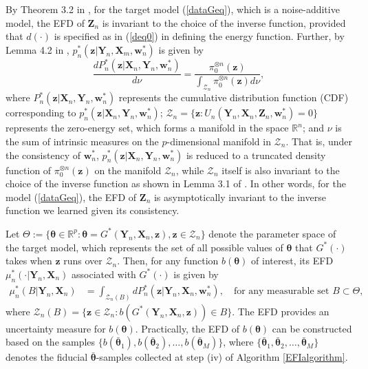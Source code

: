 \documentclass[11pt]{article}
\newcommand{\bX}{{\boldsymbol X}}
\newcommand{\bY}{{\boldsymbol Y}}
\newcommand{\bz}{{\boldsymbol z}}
\newcommand{\bZ}{{\boldsymbol Z}}
\newcommand{\bw}{{\boldsymbol w}}
\newcommand{\btheta}{{\boldsymbol \theta}}
\begin{document}
By Theorem 3.2 in \cite{LiangKS2024EFI}, for the target model (\ref{dataGeq}), which is a noise-additive model, the EFD of $\bZ_n$ is 
invariant to the choice of the inverse function, provided that $d(\cdot)$ is  specified as in (\ref{deq0}) in defining the energy function. 
Further, by Lemma 4.2 in \cite{LiangKS2024EFI}, $p_n^*(\bz|\bY_n,\bX_m,\bw_n^*)$ is given by 
\begin{equation} \label{EFDeq:Z}
\frac{dP_n^*(\bz|\bX_n,\bY_n,\bw_n^*)}{d\nu}= \frac{\pi_0^{\otimes n}(\bz)}{\int_{\mathcal{Z}_n} \pi_0^{\otimes n}(\bz) d \nu}, 
\end{equation}
where $P_n^*(\bz|\bX_n,\bY_n,\bw_n^*)$ 
represents the cumulative distribution 
function (CDF) corresponding to $p_n^*(\bz|\bX_n,\bY_n,\bw_n^*)$;
$\mathcal{Z}_n=\{\bz: U_n(\bY_n,\bX_n,\bZ_n, \bw_n^*)=0\}$  
represents the zero-energy set, which forms a 
manifold in the space $\mathbb{R}^n$; and 
$\nu$ is the sum of intrinsic measures on the $p$-dimensional manifold in 
$\mathcal{Z}_n$. That is, under the consistency of $\bw_n^*$,   
$p_n^*(\bz|\bX_n,\bY_n,\bw_n^*)$ is reduced to a truncated density function  of $\pi_0^{\otimes n}(\bz)$ on the manifold 
$\mathcal{Z}_n$, while $\mathcal{Z}_n$ itself is also invariant to 
the choice of the inverse function as shown in Lemma 3.1 of \cite{LiangKS2024EFI}. In other words, for the model (\ref{dataGeq}), 
the EFD of $\bZ_n$ is asymptotically invariant to the inverse function we learned given its consistency.  

 
Let $\Theta:=\{\btheta \in \mathbb{R}^p: \btheta=G^*(\bY_n,\bX_n,\bz), \bz\in \mathcal{Z}_n\}$ denote the parameter space of the target model, which represents the set of all possible values of $\btheta$ that $G^*(\cdot)$ takes when $\bz$ runs over $\mathcal{Z}_n$.
Then, for any function $b(\btheta)$ of 
interest, its EFD $\mu_n^*(\cdot|\bY_n,\bX_n)$ associated with 
 $G^*(\cdot)$ is given by 
\begin{equation} \label{EFDeq}
\begin{split}
\mu_n^*(B|\bY_n,\bX_n) &=\int_{\mathcal{Z}_n(B)} d P_n^*(\bz|\bY_n,\bX_n,\bw_n^*),   \quad \mbox{for any measurable set $B \subset \Theta$},
\end{split}
\end{equation}
where $\mathcal{Z}_n(B)=\{\bz\in \mathcal{Z}_n: b(G^*(\bY_n,\bX_n,\bz)) \in B\}$. The EFD provides an uncertainty measure for $b(\btheta)$. 
Practically, 
the EFD of $b(\btheta)$ can be constructed based on the samples
$\{b(\bar{\btheta}_1), 
b(\bar{\btheta}_2), \ldots, b(\bar{\btheta}_M)\}$, where 
$\{\bar{\btheta}_1, \bar{\btheta}_2, \ldots, \bar{\btheta}_M\}$ denotes  
the fiducial $\bar{\btheta}$-samples collected at step (iv) of Algorithm \ref{EFIalgorithm}. 
\end{document}
